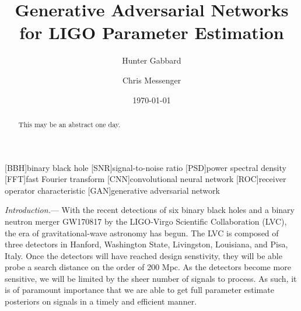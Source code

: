 \documentclass[%
showpacs,
 amsmath,amssymb,
 aps,
 twocolumn,
 prl,
 reprint,
floatfix,
]{revtex4-1}
\newcommand{\dcc}{LIGO-P1700378}
\begin{document}

%
%
\title{Generative Adversarial Networks for LIGO Parameter Estimation}

\author{Hunter Gabbard}
\author{Chris Messenger}

\date{\today}%


%
%
\begin{abstract} 
%
This may be an abstract one day.
%
\end{abstract}





\maketitle

[BBH]{binary black hole}
[SNR]{signal-to-noise ratio}
[PSD]{power spectral density}
[FFT]{fast Fourier transform}
[CNN]{convolutional neural network}
[ROC]{receiver operator characteristic}
[GAN]{generative adversarial network}


%
%

%
%
\textit{Introduction.}--- 
%
With the recent detections of six binary black holes \cite{detection papers}
and a binary neutron merger GW170817 \cite{BNS paper} by the LIGO-Virgo
Scientific Collaboration (LVC), the era of gravitational-wave astronomy has
begun. The LVC is composed of three detectors in Hanford, Washington State,
Livingston, Louisiana, and Pisa, Italy. Once the detectors will have reached
design senstivity, they will be able probe a search distance on the order of
200 Mpc. As the detectors become more sensitive, we will be limited by the
sheer number of signals to process. As such, it is of paramount importance that
we are able to get full parameter estimate posteriors on signals in a timely
and efficient manner.
\end{document}
